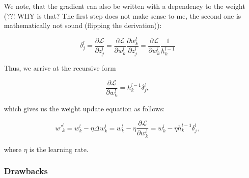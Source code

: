 \documentclass[main]{subfiles}
\begin{document}
We note, that the gradient can also be written with a dependency to the weight (??! WHY is that? The first step does not make sense to me, the second one is mathematically not sound (flipping the derivation)):

\begin{equation}
    \delta_j^l = \frac{\partial \mathcal{L}}{\partial z_j^l} = \frac{\partial \mathcal{L}}{\partial w_k^l} \frac{\partial w_k^l}{\partial z_j^l} = \frac{\partial \mathcal{L}}{\partial w_k^l} \frac{1}{h_k^{l-1}}
\end{equation}

Thus, we arrive at the recursive form

\begin{equation}
    \frac{\partial \mathcal{L}}{\partial w_k^l} = h_k^{l-1} \delta_j^l, 
\end{equation}

which gives us the weight update equation as follows:

\begin{equation}
    {w'}_k^l = w_k^l - \eta \Delta w_k^l= w_k^l - \eta \frac{\partial \mathcal{L}}{\partial w_k^l} = w_k^l - \eta h_k^{l-1} \delta_j^l,
\end{equation}

where $\eta$ is the learning rate. 

\subsubsection{Drawbacks}
\end{document}

